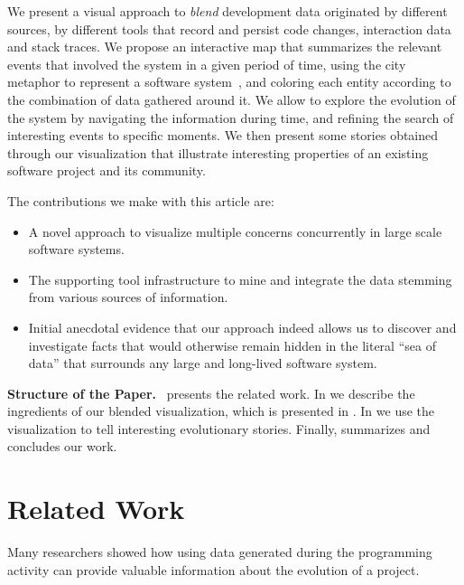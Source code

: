 We present a visual approach to \emph{blend} development data originated by different  sources, \eg by different tools that record and persist code changes, interaction data and stack traces.
We propose an interactive map that summarizes the relevant events that involved the system in a given period of time, using the city metaphor to represent a software system~\cite{Wett2007}, and coloring each entity according to the combination of data gathered around it.
We allow to explore the evolution of the system by navigating the information during time, and refining the search of interesting events to specific moments.
We then present some stories obtained through our visualization that illustrate interesting properties of an existing software project and its community.

The contributions we make with this article are:

\begin{itemize}

\item A novel approach to visualize multiple concerns concurrently in large scale software systems.

\item The supporting tool infrastructure to mine and integrate the data stemming from various sources of information.

\item Initial anecdotal evidence that our approach indeed allows us to discover and investigate facts that would otherwise remain hidden in the literal ``sea of data'' that surrounds any large and long-lived software system.

\end{itemize}

\textbf{Structure of the Paper.}~ presents the related work.
In  we describe the ingredients of our blended visualization, which is presented in .
In  we use the visualization to tell interesting evolutionary stories.
Finally,  summarizes and concludes our work.



\section{Related Work}\label{sec:related}

Many researchers showed how using data generated during the programming activity can provide valuable information about the evolution of a project.

